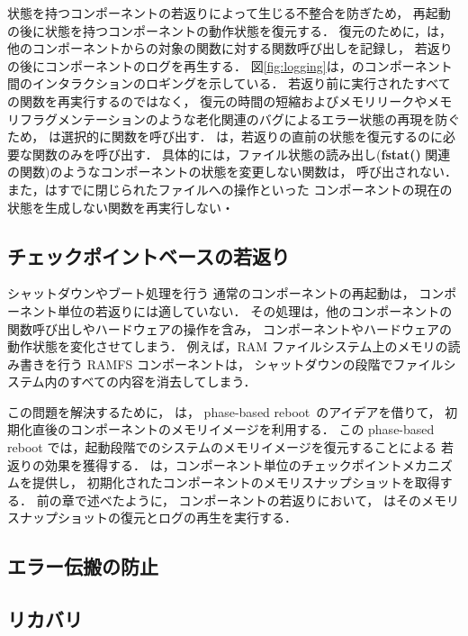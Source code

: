状態を持つコンポーネントの若返りによって生じる不整合を防ぎため，
再起動の後に状態を持つコンポーネントの動作状態を復元する．
復元のために，\sysname は，他のコンポーネントからの対象の関数に対する関数呼び出しを記録し，
若返りの後にコンポーネントのログを再生する．
図\ref{fig:logging}は，\sysname のコンポーネント間のインタラクションのロギングを示している．
若返り前に実行されたすべての関数を再実行するのではなく，
復元の時間の短縮およびメモリリークやメモリフラグメンテーションのような老化関連のバグによるエラー状態の再現を防ぐため，
\sysname は選択的に関数を呼び出す．
\sysname は，若返りの直前の状態を復元するのに必要な関数のみを呼び出す．
具体的には，ファイル状態の読み出し(\textbf{fstat()} 関連の関数)のようなコンポーネントの状態を変更しない関数は，
呼び出されない．
また，\sysname はすでに閉じられたファイルへの操作といった
コンポーネントの現在の状態を生成しない関数を再実行しない・

\subsection{チェックポイントベースの若返り}

シャットダウンやブート処理を行う
通常のコンポーネントの再起動は，
コンポーネント単位の若返りには適していない．
その処理は，他のコンポーネントの関数呼び出しやハードウェアの操作を含み，
コンポーネントやハードウェアの動作状態を変化させてしまう．
例えば，RAM ファイルシステム上のメモリの読み書きを行う RAMFS コンポーネントは，
シャットダウンの段階でファイルシステム内のすべての内容を消去してしまう．

この問題を解決するために，
\sysname は，
phase-based reboot~\cite{YamakitaEtAl-PBR}のアイデアを借りて，
初期化直後のコンポーネントのメモリイメージを利用する．
この phase-based reboot では，起動段階でのシステムのメモリイメージを復元することによる
若返りの効果を獲得する．
\sysname は，コンポーネント単位のチェックポイントメカニズムを提供し，
初期化されたコンポーネントのメモリスナップショットを取得する．
前の章で述べたように，
コンポーネントの若返りにおいて，
\sysname はそのメモリスナップショットの復元とログの再生を実行する．

\subsection{エラー伝搬の防止}

\subsection{リカバリ}

